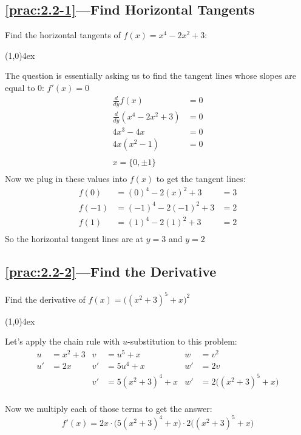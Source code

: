 \documentclass{MathNotes}
\newcommand{\br}{
\begin{center}
\line(1,0){4ex}
\end{center}}
\begin{document}
\subsection*{\ref{prac:2.2-1}---Find Horizontal Tangents}\label{ans:2.2-1}
Find the horizontal tangents of $f(x)=x^4-2x^2+3$:
\br
The question is essentially asking us to find the tangent lines whose
slopes are equal to 0: $f'(x)=0$
\begin{align*}
    \frac{d}{dy}f(x)&=0\\
    \frac{d}{dy}(x^4-2x^2+3)&=0\\
    4x^3-4x &=0\\
    4x(x^2-1)&=0\\
    \\
    x=\{0, \pm 1\}\\
\end{align*}
Now we plug in these values into $f(x)$ to get the tangent lines:
\begin{align*}
    f(0)&=(0)^4-2(x)^2+3&=3\\
    f(-1)&=(-1)^4-2(-1)^2+3&=2\\
    f(1)&=(1)^4-2(1)^2+3&=2\\
\end{align*}
So the horizontal tangent lines are at $y=3$ and $y=2$

\newpage
\subsection*{\ref{prac:2.2-2}---Find the Derivative}
Find the derivative of $\displaystyle f(x)=\big((x^2+3)^5+x\big)^2$
\br
Let's apply the chain rule with $u$-substitution to this problem:
\begin{align*}
    u&=x^2+3 & v&=u^5+x & w&=v^2\\
    u'&=2x & v'&=5u^4+x & w'&=2v\\
    && v'&=5(x^2+3)^4+x & w'&=2\big((x^2+3)^5+x)\\
\end{align*}

Now we multiply each of those terms to get the answer:
$$f'(x)=2x\cdot\big(5(x^2+3)^4+x\big)\cdot2\big((x^2+3)^5+x\big)$$
\end{document}
